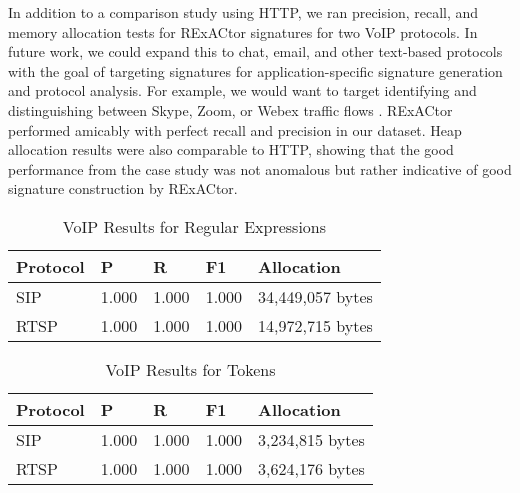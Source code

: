 In addition to a comparison study using HTTP, we ran precision, recall, and memory allocation tests for RExACtor signatures for two VoIP protocols. In future work, we could expand this to chat, email, and other text-based protocols with the goal of targeting signatures for application-specific signature generation and protocol analysis. For example, we would want to target identifying and distinguishing between Skype, Zoom, or Webex traffic flows \cite{Zhang}. RExACtor performed amicably with perfect recall and precision in our dataset. Heap allocation results were also comparable to HTTP, showing that the good performance from the case study was not anomalous but rather indicative of good signature construction by RExACtor.

\begin{table}[H]
  \centering
  \begin{tabular}{|l|l|l|l|l|}
   \hline
   Protocol & P & R & F1 & Allocation \\
   \hline\hline
   SIP & 1.000 & 1.000 & 1.000 & 34,449,057 bytes\\
   RTSP & 1.000 & 1.000 & 1.000 & 14,972,715 bytes \\
   \hline
  \end{tabular}
  \caption{VoIP Results for Regular Expressions}
  \label{table:voipregex}
\end{table}

\begin{table}[H]
  \centering
  \begin{tabular}{|l|l|l|l|l|}
   \hline
   Protocol & P & R & F1 & Allocation \\
   \hline\hline
   SIP & 1.000 & 1.000 & 1.000 & 3,234,815 bytes\\
   RTSP & 1.000 & 1.000 & 1.000 & 3,624,176 bytes \\
   \hline
  \end{tabular}
  \caption{VoIP Results for Tokens}
  \label{table:voiptokens}
\end{table}

